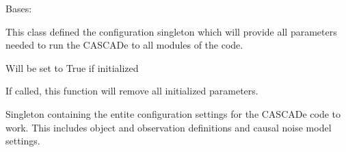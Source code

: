 \documentclass[a4paper,10pt,english]{sphinxmanual}
\begin{document}
\begin{fulllineitems}
\label{\detokenize{cascade.initialize:cascade.initialize.initialize.configurator}}
Bases: 

This class defined the configuration singleton which will provide
all parameters needed to run the CASCADe to all modules of the code.

\begin{fulllineitems}
\label{\detokenize{cascade.initialize:cascade.initialize.initialize.configurator.isInitialized}}
Will be set to True if initialized

\end{fulllineitems}


\begin{fulllineitems}
\label{\detokenize{cascade.initialize:cascade.initialize.initialize.configurator.reset}}
If called, this function will remove all initialized parameters.

\end{fulllineitems}


\end{fulllineitems}


\begin{fulllineitems}
\label{\detokenize{cascade.initialize:cascade.initialize.initialize.cascade_configuration}}
Singleton containing the entite configuration settings for the
CASCADe code to work. This includes object and observation definitions and
causal noise model settings.

\end{fulllineitems}
\end{document}
